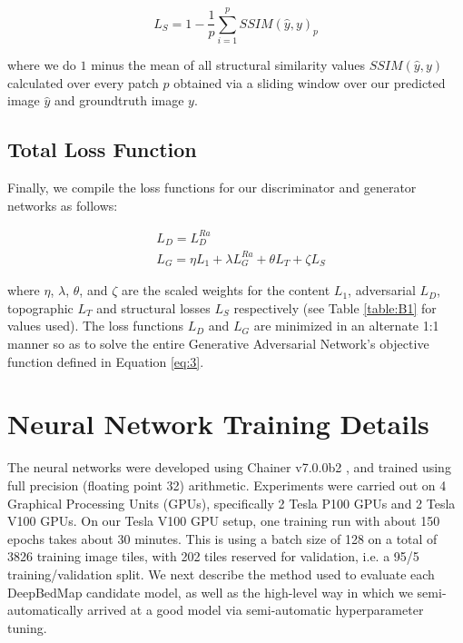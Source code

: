 \documentclass[tc, manuscript]{copernicus}
\begin{document}
\begin{equation}\label{eq:A7}
  L_S = 1 - \dfrac{1}{p} \sum\limits_{i=1}^p SSIM(\hat{y}, y)_p
\end{equation}

where we do $1$ minus the mean of all structural similarity values $SSIM(\hat{y}, y)$ calculated over every patch $p$ obtained via a sliding window over our predicted image ${\hat{y}}$ and groundtruth image $y$.

\subsection{Total Loss Function}

Finally, we compile the loss functions for our discriminator and generator networks as follows:

\begin{align}
  & L_D = L_D^{Ra} \label{eq:A8}\\
  & L_G = \eta L_1 + \lambda L_G^{Ra} + \theta L_T + \zeta L_S \label{eq:A9}
\end{align}

where $\eta$, $\lambda$, $\theta$, and $\zeta$ are the scaled weights for the content $L_1$, adversarial $L_D$, topographic $L_T$ and structural losses $L_S$ respectively (see Table \ref{table:B1} for values used).
The loss functions $L_D$ and $L_G$ are minimized in an alternate 1:1 manner so as to solve the entire Generative Adversarial Network's objective function defined in Equation \eqref{eq:3}.

\section{Neural Network Training Details} \label{appendix:B}

The neural networks were developed using Chainer v7.0.0b2 \citep{TokuiChainerDeepLearning2019}, and trained using full precision (floating point 32) arithmetic.
Experiments were carried out on 4 Graphical Processing Units (GPUs), specifically 2 Tesla P100 GPUs and 2 Tesla V100 GPUs.
On our Tesla V100 GPU setup, one training run with about 150 epochs takes about 30 minutes.
This is using a batch size of 128 on a total of 3826 training image tiles, with 202 tiles reserved for validation, i.e. a 95/5 training/validation split.
We next describe the method used to evaluate each DeepBedMap candidate model, as well as the high-level way in which we semi-automatically arrived at a good model via semi-automatic hyperparameter tuning.
\end{document}
